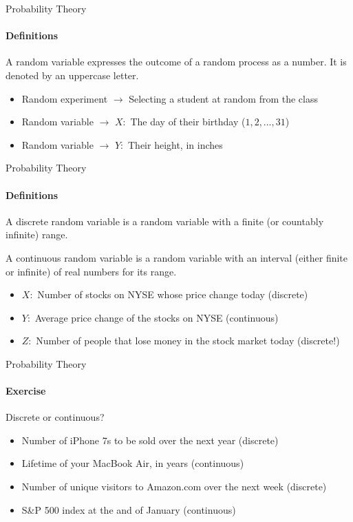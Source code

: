 \documentclass{beamer}\usepackage[]{graphicx}\usepackage[]{color}
\begin{document}
\begin{darkframes}
\begin{frame}{Probability Theory}
\framesubtitle{Definitions}
\begin{definition}
		A \alert{random variable} expresses the outcome of a random process as a number. It is denoted by an uppercase letter.
\end{definition} 	\pause

\begin{itemize}[<+->]
	\item Random experiment $\rightarrow$ Selecting a student at random from the class
	\item Random variable $\rightarrow$ $X:$ The day of their birthday ($1,2,\ldots,31$)
  \item Random variable $\rightarrow$ $Y:$ Their height, in inches
\end{itemize}
\end{frame}


\begin{frame}{Probability Theory}
\framesubtitle{Definitions}

\begin{definition}
		A \alert{discrete random variable} is a random variable with a finite (or countably infinite) range.  \pause

		A \alert{continuous random variable} is a random variable with an interval (either finite or infinite) of real numbers for its range.
\end{definition} \pause

\begin{itemize}[<+->]
  \item $X:$ Number of stocks on NYSE whose price change today (discrete)
  \item $Y:$ Average price change of the stocks on NYSE (continuous)
  \item $Z:$ Number of people that lose money in the stock market today (discrete!)
\end{itemize}
\end{frame}


\begin{frame}{Probability Theory}
\framesubtitle{Exercise}
Discrete or continuous?  \pause
\begin{itemize}[<+->]
	\item Number of iPhone 7s to be sold over the next year  \pause (discrete)
	\item Lifetime of your MacBook Air, in years  \pause (continuous)
	\item Number of unique visitors to Amazon.com over the next week  \pause (discrete)
  \item S\&P 500 index at the and of January \pause (continuous)
\end{itemize}
\lc
\end{frame}



\end{darkframes}
\end{document}
